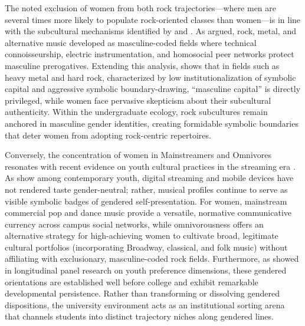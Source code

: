\documentclass[12pt]{article}
\begin{document}
The noted exclusion of women from both rock trajectories---where men are several times more likely to populate rock-oriented classes than women---is in line with the subcultural mechanisms identified by \citet{miller2014symbolic} and \citet{clawson1999when}. As \citet{clawson1999when} argued, rock, metal, and alternative music developed as masculine-coded fields where technical connoisseurship, electric instrumentation, and homosocial peer networks protect masculine prerogatives. Extending this analysis, \citet{miller2014symbolic} shows that in fields such as heavy metal and hard rock, characterized by low institutionalization of symbolic capital and aggressive symbolic boundary-drawing, ``masculine capital'' is directly privileged, while women face pervasive skepticism about their subcultural authenticity. Within the undergraduate ecology, rock subcultures remain anchored in masculine gender identities, creating formidable symbolic boundaries that deter women from adopting rock-centric repertoires.

Conversely, the concentration of women in Mainstreamers and Omnivores resonates with recent evidence on youth cultural practices in the streaming era \citep{carbone2024adolescents,delsing2008adolescents}. As \citet{carbone2024adolescents} show among contemporary youth, digital streaming and mobile devices have not rendered taste gender-neutral; rather, musical profiles continue to serve as visible symbolic badges of gendered self-presentation. For women, mainstream commercial pop and dance music provide a versatile, normative communicative currency across campus social networks, while omnivorousness offers an alternative strategy for high-achieving women to cultivate broad, legitimate cultural portfolios (incorporating Broadway, classical, and folk music) without affiliating with exclusionary, masculine-coded rock fields. Furthermore, as \citet{delsing2008adolescents} showed in longitudinal panel research on youth preference dimensions, these gendered orientations are established well before college and exhibit remarkable developmental persistence. Rather than transforming or dissolving gendered dispositions, the university environment acts as an institutional sorting arena that channels students into distinct trajectory niches along gendered lines.

\end{document}
